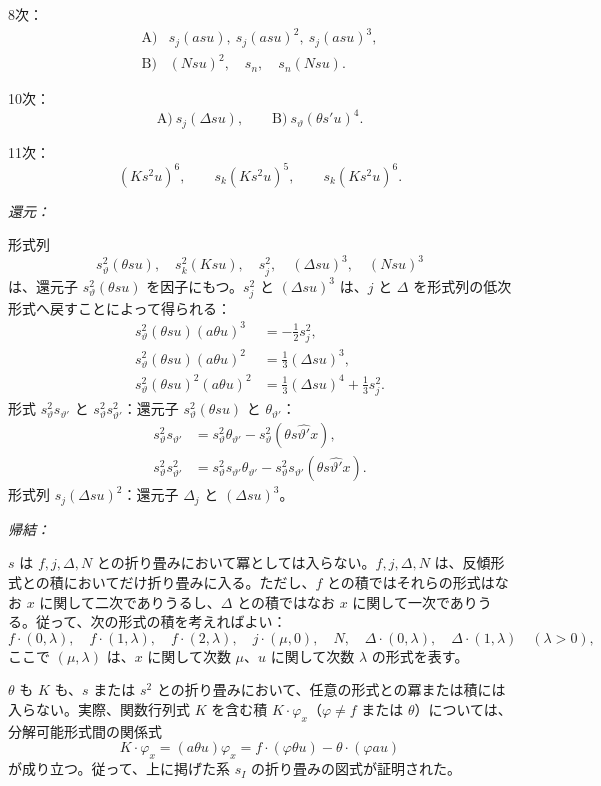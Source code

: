 \documentclass[11pt]{jlreq}
\newcommand{\A}{\Delta}
\begin{document}
\noindent 8次：
\[
\begin{array}{ll}
\text{A)}&s_j(asu),\ s_j(asu)^2,\ s_j(asu)^3,\\[0.4em]
\text{B)}&(Nsu)^2,\quad s_n,\quad s_n(Nsu).
\end{array}
\]

\noindent 10次：
\[
\text{A)}\ s_j(\A su),\qquad \text{B)}\ s_\vartheta(\theta s'u)^4.
\]

\noindent 11次：
\[
(Ks^2u)^6,\qquad s_k(Ks^2u)^5,
\qquad s_k(Ks^2u)^6.
\]

\noindent\emph{還元：}

形式列
\[
 s_\vartheta^2(\theta su),\quad s_k^2(Ksu),\quad s_j^2,\quad (\A su)^3,
 \quad (Nsu)^3
\]
は、還元子 $s_\vartheta^2(\theta su)$ を因子にもつ。$s_j^2$ と $(\A su)^3$ は、$j$ と $\A$ を形式列の低次形式へ戻すことによって得られる：
\[
\begin{aligned}
s_\vartheta^2(\theta su)(a\theta u)^3&=-\frac12s_j^2,\\
s_\vartheta^2(\theta su)(a\theta u)^2&=\frac13(\A su)^3,\\
s_\vartheta^2(\theta su)^2(a\theta u)^2&=\frac13(\A su)^4+\frac13s_j^2.
\end{aligned}
\]
形式 $s_\vartheta^2s_{\vartheta'}$ と $s_\vartheta^2s_{\vartheta'}^2$：還元子 $s_\vartheta^2(\theta su)$ と $\theta_{\vartheta'}$：
\[
\begin{aligned}
s_\vartheta^2s_{\vartheta'}&=s_\vartheta^2\theta_{\vartheta'}-s_\vartheta^2(\theta s\widehat{\vartheta'}x),\\
s_\vartheta^2s_{\vartheta'}^2&=s_\vartheta^2s_{\vartheta'}\theta_{\vartheta'}-s_\vartheta^2s_{\vartheta'}(\theta s\widehat{\vartheta'}x).
\end{aligned}
\]
形式列 $s_j(\A su)^2$：還元子 $\A_j$ と $(\A su)^3$。

\noindent\emph{帰結：}

$s$ は $f,j,\A,N$ との折り畳みにおいて冪としては入らない。$f,j,\A,N$ は、反傾形式との積においてだけ折り畳みに入る。ただし、$f$ との積ではそれらの形式はなお $x$ に関して二次でありうるし、$\A$ との積ではなお $x$ に関して一次でありうる。従って、次の形式の積を考えればよい：
\[
 f\cdot(0,\lambda),\quad f\cdot(1,\lambda),\quad f\cdot(2,\lambda),\quad
 j\cdot(\mu,0),\quad N,\quad
 \A\cdot(0,\lambda),\quad \A\cdot(1,\lambda)\quad(\lambda>0),
\]
ここで $(\mu,\lambda)$ は、$x$ に関して次数 $\mu$、$u$ に関して次数 $\lambda$ の形式を表す。

$\theta$ も $K$ も、$s$ または $s^2$ との折り畳みにおいて、任意の形式との冪または積には入らない。実際、関数行列式 $K$ を含む積 $K\cdot\varphi_x$（$\varphi\ne f$ または $\theta$）については、分解可能形式間の関係式
\[
 K\cdot\varphi_x=(a\theta u)\varphi_x=f\cdot(\varphi\theta u)-\theta\cdot(\varphi au)
\]
が成り立つ。従って、上に掲げた系 $s_I$ の折り畳みの図式が証明された。
\end{document}
